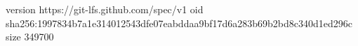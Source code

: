 version https://git-lfs.github.com/spec/v1
oid sha256:1997834b7a1e314012543dfe07eabddaa9bf17d6a283b69b2bd8c340d1ed296c
size 349700
